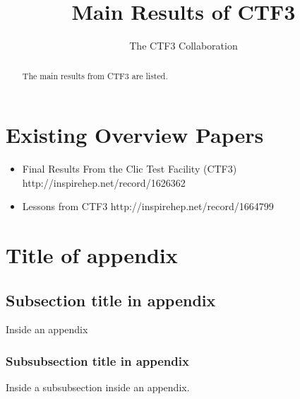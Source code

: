\documentclass[biblatex]{cernrep}
\begin{document}
\title{Main Results of CTF3}

\author{The CTF3 Collaboration}


\begin{abstract}
The main results from CTF3 are listed.
\end{abstract}


\maketitle




\section{Existing Overview Papers}

\begin{itemize}
\item Final Results From the Clic Test Facility (CTF3)
http://inspirehep.net/record/1626362

\item Lessons from CTF3
http://inspirehep.net/record/1664799
\end{itemize}



















\appendix
\section{Title of appendix}
\label{sec:app}

\subsection{Subsection title in appendix}
Inside an appendix
\subsubsection{Subsubsection title in appendix}
Inside a subsubsection inside an appendix.

\end{document}
